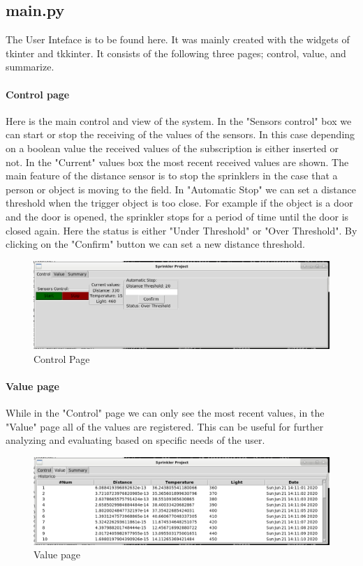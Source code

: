 \documentclass{article}
\begin{document}
\subsection{main.py}
The User Inteface is to be found here. It was mainly created with the widgets of tkinter and tkkinter. It consists of the following three pages; control, value, and summarize.
\paragraph{Control page}
Here is the main control and view of the system. In the "Sensors control" box we can start or stop the receiving of the values of the sensors. In this case depending on a boolean value the received values of the subscription is either inserted or not. In the "Current" values box the most recent received values are shown. The main feature of the distance sensor is to stop the sprinklers in the case that a person or object is moving to the field. In "Automatic Stop" we can set a distance threshold when the trigger object is too close. For example if the object is a door and the door is opened, the sprinkler stops for a period of time until the door is closed again. Here the status is either "Under Threshold" or "Over Threshold". By clicking on the "Confirm" button we can set a new distance threshold.
\begin{figure}
    \centering
	\includegraphics[scale=0.3]{control_view.png}
	\caption{Control Page}
	\label{fig:control}
\end{figure}
\paragraph{Value page}
While in the "Control" page we can only see the most recent values, in the "Value" page all of the values are registered. This can be useful for further analyzing and evaluating based on specific needs of the user. 
\begin{figure}
    \centering
    \includegraphics[scale=0.3]{value_view.png}
	\caption{Value page}
	\label{fig:value}
\end{figure}
\end{document}
